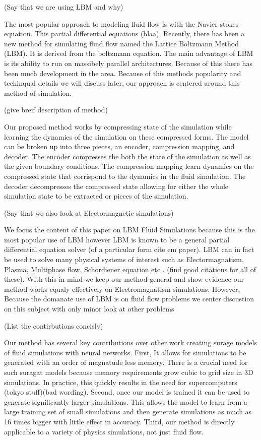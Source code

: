 \documentclass{article}
\begin{document}
(Say that we are using LBM and why)

The most popular approach to modeling fluid flow is with the Navier stokes equation. This partial differential equations (blaa). Recently, there has been a new method for simulating fluid flow named the Lattice Boltzmann Method (LBM). It is derived from the boltzmann equation. The main advantage of LBM is its ability to run on massibely parallel architectures. Because of this there has been much development in the area. Because of this methods popularity and techinqual details we will discuss later, our approach is centered around this method of simulation.

(give breif description of method)

Our proposed method works by compressing state of the simulation while learning the dynamics of the simulation on these compressed forms. The model can be broken up into three pieces, an encoder, compression mapping, and decoder. The encoder compresses the both the state of the simulation as well as the given boundary conditions. The compression mapping learn dynamics on the compressed state that corrispond to the dynamics in the fluid simulation. The decoder decompresses the compressed state allowing for either the whole simulation state to be extracted or pieces of the simulation.

(Say that we also look at Electormagnetic simulations)

We focus the content of this paper on LBM Fluid Simulations because this is the most popular use of LBM however LBM is known to be a general partial differential equation solver (of a particular form cite em paper). LBM can in fact be used to solve many physical systems of interest such as Electormagnatism, Plasma, Multiphase flow, Schordiener equation etc \cite{mendoza2010three}. (find good citations for all of these). With this in mind we keep our method general and show evidence our method works equaly effectively on Electromagnatism simulations. However, Because the domanate use of LBM is on fluid flow problems we center discustion on this subject with only minor look at other problems

(List the contirbutions concisly)

Our method has several key contributions over other work creating surage models of fluid simulations with neural networks. First, It allows for simulations to be generated with an order of magnatude less memory. There is a crucial need for such suragat models because memory requirements grow cubic to grid size in 3D simulations. In practice, this quickly results in the need for supercomputers (tokyo stuff)(bad wording). Second, once our model is trained it can be used to generate significantly larger simulations. This allows the model to learn from a large training set of small simulations and then generate simulations as much as 16 times bigger with little effect in accuracy. Third, our method is directly applicable to a variety of physics simulations, not just fluid flow.
\end{document}
